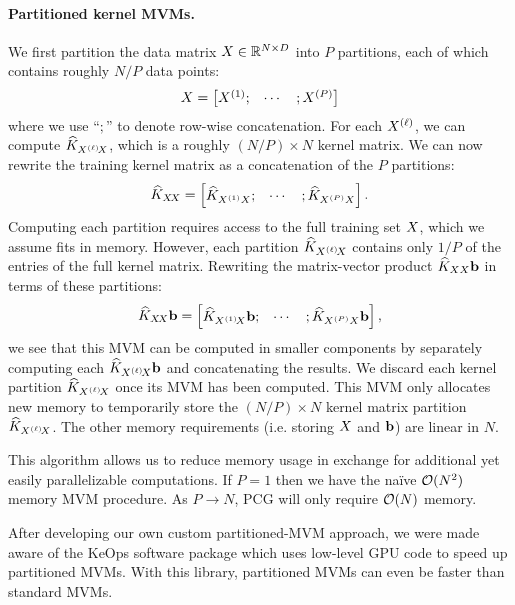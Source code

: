 \paragraph{Partitioned kernel MVMs.}
We first partition the data matrix $X \in \mathbb{R}^{N \times D}$ into $P$ partitions, each of which contains roughly $N/P$ data points:
%
\[
  X = \begin{bmatrix}
    X^{(1)}; &
    \cdots &
    ; X^{(P)}
  \end{bmatrix}
\]
%
where we use ``$;$'' to denote row-wise concatenation.
For each $X^{(\ell)}$, we can compute $\widehat {K}_{X^{(\ell)}\!X}$, which is a roughly $(N / P) \times N$ kernel matrix.
We can now rewrite the training kernel matrix as a concatenation of the $P$ partitions:
%
\[
  \widehat {K}_{X\!X} = \begin{bmatrix}
      \widehat {K}_{X^{(1)}X}; &
    \cdots &
    ; \widehat {K}_{X^{(P)}X}
  \end{bmatrix}.
\]
%
Computing each partition requires access to the full training set $X$, which we assume fits in memory.
However, each partition $\widehat {K}_{X^{(\ell)}\!X}$ contains only $1/P$ of the entries of the full kernel matrix.
Rewriting the matrix-vector product $\widehat{K}_{XX} \mathbf{b}$ in terms of these partitions:
%
\[
  \widehat {K}_{X\!X} \mathbf{b} = \begin{bmatrix}
    \widehat {K}_{X^{(1)}\!X} \mathbf{b}; &
    \cdots &
    ; \widehat {K}_{X^{(P)}X} \mathbf{b}
  \end{bmatrix},
\]
%
we see that this MVM can be computed in smaller components by separately computing each $\widehat {K}_{X^{(\ell)}\!X} \mathbf{b}$ and concatenating the results.
We discard each kernel partition $\widehat {K}_{X^{(\ell)}\!X}$ once its MVM has been computed.
This MVM only allocates new memory to temporarily store the $(N / P) \times N$ kernel matrix partition $\widehat {K}_{X^{(\ell)}\!X}$.
The other memory requirements (i.e. storing $X$ and $\mathbf{b}$) are linear in $N$.

This algorithm allows us to reduce memory usage in exchange for additional yet easily parallelizable computations.
If $P=1$ then we have the na\"ive $\bigo{N^2}$ memory MVM procedure. As $P \to N$, PCG will only require $\bigo{N}$ memory.

After developing our own custom partitioned-MVM approach, we were made aware of the KeOps software package \cite{charlier2020kernel} which uses low-level GPU code to speed up partitioned MVMs.
With this library, partitioned MVMs can even be faster than standard MVMs.


